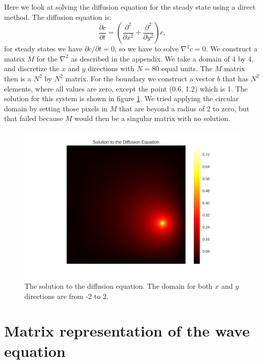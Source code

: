 \documentclass[a4paper]{article}
\begin{document}
Here we look at solving the diffusion equation for the steady state using a direct method. The diffusion equation is:
\begin{equation*} \label{eq:diffusion}
    \frac{\partial c}{\partial t} = \left( \frac{\partial^2}{\partial x^2} + \frac{\partial^2}{\partial y^2} \right) c,
\end{equation*}
for steady states we have $\partial c/ \partial t = 0$, so we have to solve $\nabla^2 c = 0$. We construct a matrix $M$ for the $\nabla^2$ as described in the appendix. We take a domain of 4 by 4, and discretize the $x$ and $y$ directions with $N=80$ equal units. The $M$ matrix then is a $N^2$ by $N^2$ matrix. For the boundary we construct a vector $b$ that has $N^2$ elements, where all values are zero, except the point (0.6, 1.2) which is 1. The solution for this system is shown in figure \ref{fig:diffusion}. We tried applying the circular domain by setting those pixels in $M$ that are beyond a radius of 2 to zero, but that failed because $M$ would then be a singular matrix with no solution.

\begin{figure}
\centering
\includegraphics[width=14cm]{diffusion}
\caption{The solution to the diffusion equation. The domain for both $x$ and $y$ directions are from -2 to 2.}
\label{fig:diffusion}
\end{figure}

\newpage
\appendix
\section{Matrix representation of the wave equation}
\label{app:A}
\end{document}
